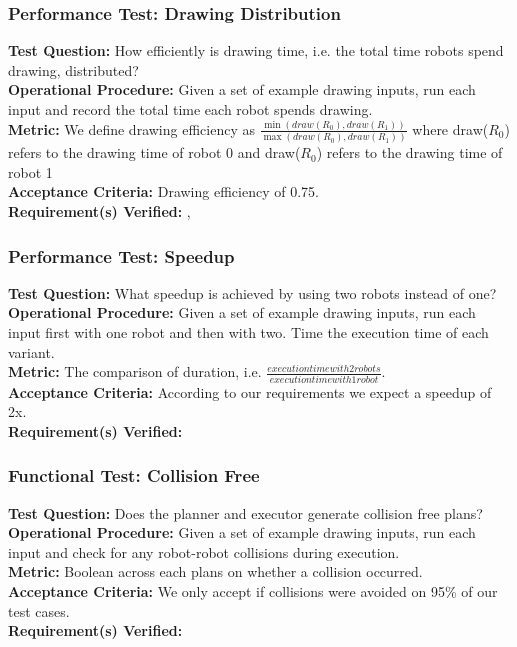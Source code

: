 \subsubsection{Performance Test: Drawing Distribution}
\label{test:sdp_pt_draw}
\textbf{Test Question:} How efficiently is drawing time, i.e. the total time robots spend drawing, distributed? \\
\textbf{Operational Procedure:}  Given a set of example drawing inputs, run each input and record the total time each robot spends drawing. \\
\textbf{Metric:} We define drawing efficiency as $\frac{\min(draw(R_{0}), draw(R_{1}))}{\max(draw(R_{0}), draw(R_{1}))}$ where draw($R_{0}$) refers to the drawing time of robot 0 and draw($R_{0}$) refers to the drawing time of robot 1\\
\textbf{Acceptance Criteria:} Drawing efficiency of 0.75.\\
\textbf{Requirement(s) Verified:} , 

\subsubsection{Performance Test: Speedup}
\label{test:sdp_pt_speedup}
\textbf{Test Question:} What speedup is achieved by using two robots instead of one?\\
\textbf{Operational Procedure:} Given a set of example drawing inputs, run each input first with one robot and then with two. Time the execution time of each variant.\\
\textbf{Metric:} The comparison of duration, i.e. $\frac{execution time with 2 robots}{execution time with 1 robot}$. \\
\textbf{Acceptance Criteria:} According to our requirements we expect a speedup of 2x. \\
\textbf{Requirement(s) Verified:} 

\subsubsection{Functional Test: Collision Free}
\label{test:sdp_ft_collision}
\textbf{Test Question:} Does the planner and executor generate collision free plans?\\
\textbf{Operational Procedure:} Given a set of example drawing inputs, run each input and check for any robot-robot collisions during execution. \\
\textbf{Metric:} Boolean across each plans on whether a collision occurred.\\
\textbf{Acceptance Criteria:} We only accept if collisions were avoided on 95\% of our test cases. \\
\textbf{Requirement(s) Verified:} 

